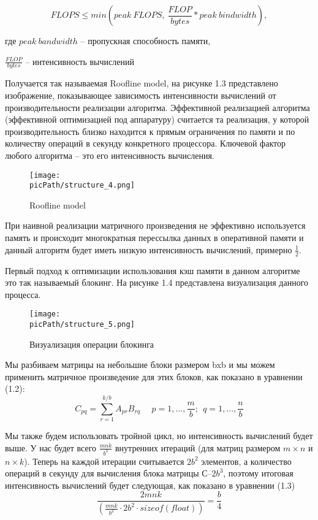 \documentclass[oneside,final,12pt]{extreport}
\newcommand{\picPath}{images}
\begin{document}
\begin{equation}
FLOPS \leq min( peak\ FLOPS,\ \frac{FLOP}{bytes} * peak\ bindwidth),
\end{equation}

где $peak\ bandwidth$ – пропускная способность памяти,

$\frac{FLOP}{bytes}$ – интенсивность вычислений

Получается так называемая Roofline model, на рисунке 1.3 представлено изображение, показывающее зависимость интенсивности вычислений от производительности реализации алгоритма. Эффективной реализацией алгоритма (эффективной оптимизацией под аппаратуру) считается та реализация, у которой производительность близко находится к прямым ограничения по памяти и по количеству операций в секунду конкретного процессора. Ключевой фактор любого алгоритма – это его интенсивность вычисления.
\begin{figure}[H]
\begin{center}
  \texttt{[image: \\picPath/structure\_4.png]}
  \caption{Roofline model}
  \label{fig:structure_4}
 \end{center}
\end{figure}

При наивной реализации матричного произведения не эффективно используется память и происходит многократная перессылка данных в оперативной памяти и данный алгоритм будет иметь низкую интенсивность вычислений, примерно $\frac{1}{2}$.

Первый подход к оптимизации использования кэш памяти в данном алгоритме  это так называемый блокинг. На рисунке 1.4 представлена визуализация данного процесса.

\begin{figure}[H]
\begin{center}
  \texttt{[image: \\picPath/structure\_5.png]}
  \caption{Визуализация операции блокинга}
  \label{fig:structure_5}
  \end{center}
\end{figure}

Мы разбиваем матрицы на небольшие блоки размером bxb и мы можем применить матричное произведение для этих блоков, как показано в уравнении (1.2):
\begin{equation}
C_{pq}=\sum_{r=1}^{k/b}A_{pr}B_{rq}\ \ \ \ \ \
p=1,...,\frac{m}{b};\ \
q=1,...,\frac{n}{b}
\end{equation}

Мы также будем использовать тройной цикл, но интенсивность вычислений будет выше. У нас будет всего $\frac{mnk}{b^3}$ внутренних итераций (для матриц размером $m \times n$ и $n \times k$). Теперь на каждой итерации считывается $2b^2$ элементов, а количество операций в секунду  для вычисления блока матрицы $С – 2b^3$, поэтому итоговая интенсивность вычислений будет следующая, как показано в уравнении (1.3)
\begin{equation}
    \frac{2mnk}{(\frac{mnk}{b^3} \cdot 2b^2 \cdot sizeof(float))} = \frac{b}{4}
\end{equation}
\end{document}

